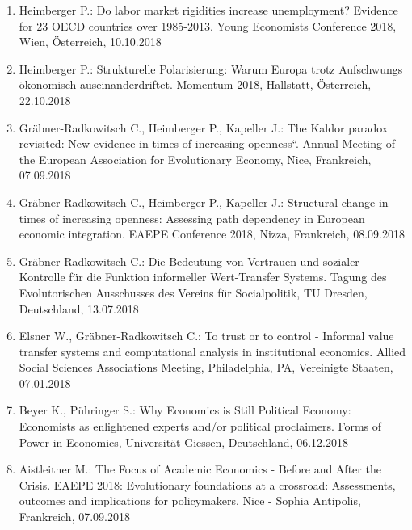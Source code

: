 \begin{enumerate}
	\item Heimberger P.: Do labor market rigidities increase unemployment? Evidence for 23 OECD countries over 1985-2013. Young Economists Conference 2018, Wien, Österreich, 10.10.2018
	\item Heimberger P.: Strukturelle Polarisierung: Warum Europa trotz Aufschwungs ökonomisch auseinanderdriftet. Momentum 2018, Hallstatt, Österreich, 22.10.2018
	\item Gräbner-Radkowitsch C., Heimberger P., Kapeller J.: The Kaldor paradox revisited: New evidence in times of increasing openness“. Annual Meeting of the European Association for Evolutionary Economy, Nice, Frankreich, 07.09.2018
	\item Gräbner-Radkowitsch C., Heimberger P., Kapeller J.: Structural change in times of increasing openness: Assessing path dependency in European economic integration. EAEPE Conference 2018, Nizza, Frankreich, 08.09.2018
	\item Gräbner-Radkowitsch C.: Die Bedeutung von Vertrauen und sozialer Kontrolle für die Funktion informeller Wert-Transfer Systems. Tagung des Evolutorischen Ausschusses des Vereins für Socialpolitik, TU Dresden, Deutschland, 13.07.2018
	\item Elsner W., Gräbner-Radkowitsch C.: To trust or to control - Informal value transfer systems and computational analysis in institutional economics. Allied Social Sciences Associations Meeting, Philadelphia, PA, Vereinigte Staaten, 07.01.2018
	\item Beyer K., Pühringer S.: Why Economics is Still Political Economy: Economists as enlightened experts and/or political proclaimers. Forms of Power in Economics, Universität Giessen, Deutschland, 06.12.2018
	\item Aistleitner M.: The Focus of Academic Economics - Before and After the Crisis. EAEPE 2018: Evolutionary foundations at a crossroad: Assessments, outcomes and implications for policymakers, Nice - Sophia Antipolis, Frankreich, 07.09.2018
\end{enumerate}
